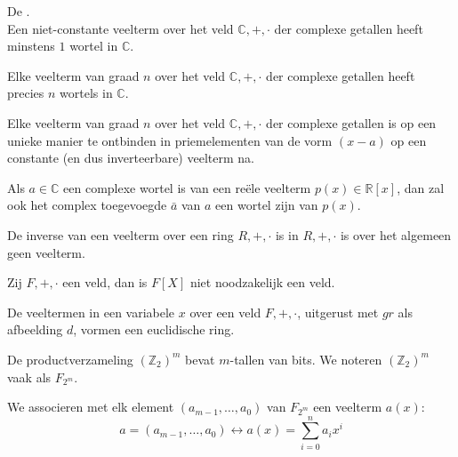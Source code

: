 \documentclass[main.tex]{subfiles}
\begin{document}
\begin{st}
  \label{st:fundamentele-stelling-van-de-algebra}
  De .\\
  Een niet-constante veelterm over het veld $\mathbb{C},+,\cdot$ der complexe getallen heeft minstens $1$ wortel in $\mathbb{C}$.
\end{st}
  
\begin{gev}
  Elke veelterm van graad $n$ over het veld $\mathbb{C},+,\cdot$ der complexe getallen heeft precies $n$ wortels in $\mathbb{C}$.
\end{gev}

\begin{gev}
  Elke veelterm van graad $n$ over het veld $\mathbb{C},+,\cdot$ der complexe getallen is op een unieke manier te ontbinden in priemelementen van de vorm $(x-a)$ op een constante (en dus inverteerbare) veelterm na.
\end{gev}

\begin{st}
  Als $a\in \mathbb{C}$ een complexe wortel is van een re\"ele veelterm $p(x)\in \mathbb{R}[x]$, dan zal ook het complex toegevoegde $\bar{a}$ van $a$ een wortel zijn van $p(x)$.
\end{st}

\begin{opm}
  De inverse van een veelterm over een ring $R,+,\cdot$ is in $R,+,\cdot$ is over het algemeen geen veelterm.
\end{opm}

\begin{opm}
  Zij $F,+,\cdot$ een veld, dan is $F[X]$ niet noodzakelijk een veld.
\end{opm}

\begin{st}
  De veeltermen in een variabele $x$ over een veld $F,+,\cdot$, uitgerust met $gr$ als afbeelding $d$, vormen een euclidische ring.
\end{st}

\begin{de}
  De productverzameling $(\mathbb{Z}_{2})^{m}$ bevat $m$-tallen van bits.
  We noteren $(\mathbb{Z}_{2})^{m}$ vaak als $F_{2^{m}}$.
\end{de}

\begin{de}
  We associeren met elk element $(a_{m-1},\dotsc,a_{0})$ van $F_{2^{m}}$ een veelterm $a(x)$:
  \[ a = (a_{m-1},\dotsc,a_{0}) \longleftrightarrow a(x) = \sum_{i=0}^{n}a_{i}x^{i} \]
\end{de}
\end{document}
